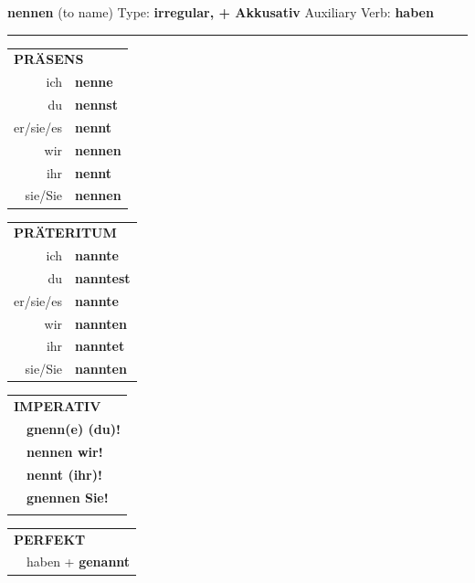 \documentclass[10pt,a4paper]{revtex4-2}
\begin{document}
\begin{verbbox-acc}
    {\Large \bf nennen} (to name) \hfill Type: \textbf{irregular, + Akkusativ} \hfill Auxiliary Verb: \textbf{haben} 
    
     \vspace{5pt}

    \hrule
    
    \vspace{5pt}

  \begin{tabular}{rl}
     \multicolumn{2}{l}{\textbf{PRÄSENS} }\\
    ich & \textbf{nenne}\\
    du & \textbf{nennst}\\
    er/sie/es & \textbf{nennt}\\
    wir & \textbf{nennen}\\
    ihr & \textbf{nennt}\\
    sie/Sie & \textbf{nennen}\\
  \end{tabular}
  \hfill
     \begin{tabular}{rl}
    \multicolumn{2}{l}{\textbf{PRÄTERITUM} }\\
    ich & \textbf{nannte}\\
    du & \textbf{nanntest}\\
    er/sie/es & \textbf{nannte}\\
    wir & \textbf{nannten}\\
    ihr & \textbf{nanntet}\\
    sie/Sie & \textbf{nannten}\\
  \end{tabular}
  \hfill
  \begin{tabular}{rl}
     \multicolumn{2}{l}{\textbf{IMPERATIV} }\\
   & \textbf{gnenn(e) (du)!}\\
   & \textbf{nennen wir!}\\
   & \textbf{nennt (ihr)!}\\
   & \textbf{gnennen Sie!}\\
   & \vspace{10pt}
  \end{tabular}

    \vspace{10pt}

 \begin{tabular}{rl}
     \multicolumn{2}{l}{\textbf{PERFEKT}}\\
  &  haben + \textbf{genannt}\\
  \end{tabular}
\hfill
   \begin{tabular}{rl}
   

\end{tabular}
\end{verbbox-acc}
\end{document}
